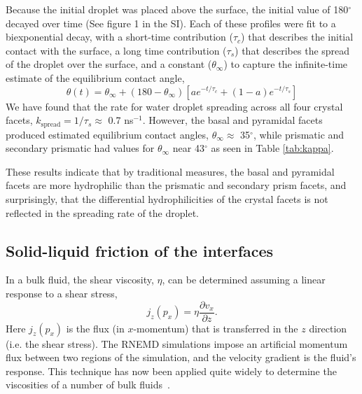 Because the initial droplet was placed above the surface, the initial
value of 180$^{\circ}$ decayed over time (See figure 1 in the
SI).  Each of these profiles were fit to a
biexponential decay, with a short-time contribution ($\tau_c$) that
describes the initial contact with the surface, a long time
contribution ($\tau_s$) that describes the spread of the droplet over
the surface, and a constant ($\theta_\infty$) to capture the
infinite-time estimate of the equilibrium contact angle,
\begin{equation}
\theta(t) = \theta_\infty +  (180-\theta_\infty) \left[ a e^{-t/\tau_c} +
  (1-a) e^{-t/\tau_s}  \right]
\end{equation}
We have found that the rate for water droplet spreading across all
four crystal facets, $k_\mathrm{spread} = 1/\tau_s \approx$ 0.7
ns$^{-1}$. However, the basal and pyramidal facets produced estimated
equilibrium contact angles, $\theta_\infty \approx$ 35$^{\circ}$, while
prismatic and secondary prismatic had values for $\theta_\infty$ near
43$^{\circ}$ as seen in Table \ref{tab:kappa}.

These results indicate that by traditional measures, the basal and
pyramidal facets are more hydrophilic than the prismatic and secondary
prism facets, and surprisingly, that the differential hydrophilicities
of the crystal facets is not reflected in the spreading rate of the
droplet.


\subsection{Solid-liquid friction of the interfaces}
In a bulk fluid, the shear viscosity, $\eta$, can be determined
assuming a linear response to a shear stress,
\begin{equation}\label{Shenyu-11}
j_{z}(p_{x}) = \eta \frac{\partial v_{x}}{\partial z}.
\end{equation}
Here $j_{z}(p_{x})$ is the flux (in $x$-momentum) that is transferred
in the $z$ direction (i.e. the shear stress). The RNEMD simulations
impose an artificial momentum flux between two regions of the
simulation, and the velocity gradient is the fluid's response. This
technique has now been applied quite widely to determine the
viscosities of a number of bulk fluids~\cite{Muller99,Bordat02,Cavalcanti07}.

